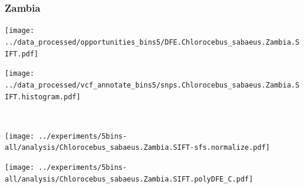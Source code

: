 \subsubsection{Zambia}

\begin{minipage}{0.49\linewidth}
    \texttt{[image: ../data\_processed/opportunities\_bins5/DFE.Chlorocebus\_sabaeus.Zambia.SIFT.pdf]}
\end{minipage}
\begin{minipage}{0.49\linewidth}
    \texttt{[image: ../data\_processed/vcf\_annotate\_bins5/snps.Chlorocebus\_sabaeus.Zambia.SIFT.histogram.pdf]}
\end{minipage}
\\
\begin{minipage}{0.49\linewidth}
    \texttt{[image: ../experiments/5bins-all/analysis/Chlorocebus\_sabaeus.Zambia.SIFT-sfs.normalize.pdf]}
\end{minipage}
\begin{minipage}{0.4\linewidth}
    \texttt{[image: ../experiments/5bins-all/analysis/Chlorocebus\_sabaeus.Zambia.SIFT.polyDFE\_C.pdf]}
\end{minipage}
